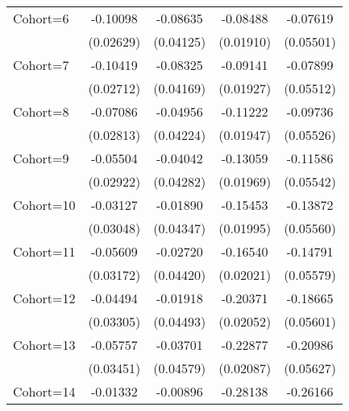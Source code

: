 \begin{table}[htbp]
\begin{tabular}{l*{4}{c}}
\addlinespace
Cohort=6            &    -0.10098\sym{***}&    -0.08635\sym{**} &    -0.08488\sym{***}&    -0.07619         \\
                    &   (0.02629)         &   (0.04125)         &   (0.01910)         &   (0.05501)         \\
\addlinespace
Cohort=7            &    -0.10419\sym{***}&    -0.08325\sym{**} &    -0.09141\sym{***}&    -0.07899         \\
                    &   (0.02712)         &   (0.04169)         &   (0.01927)         &   (0.05512)         \\
\addlinespace
Cohort=8            &    -0.07086\sym{**} &    -0.04956         &    -0.11222\sym{***}&    -0.09736\sym{*}  \\
                    &   (0.02813)         &   (0.04224)         &   (0.01947)         &   (0.05526)         \\
\addlinespace
Cohort=9            &    -0.05504\sym{*}  &    -0.04042         &    -0.13059\sym{***}&    -0.11586\sym{**} \\
                    &   (0.02922)         &   (0.04282)         &   (0.01969)         &   (0.05542)         \\
\addlinespace
Cohort=10           &    -0.03127         &    -0.01890         &    -0.15453\sym{***}&    -0.13872\sym{**} \\
                    &   (0.03048)         &   (0.04347)         &   (0.01995)         &   (0.05560)         \\
\addlinespace
Cohort=11           &    -0.05609\sym{*}  &    -0.02720         &    -0.16540\sym{***}&    -0.14791\sym{***}\\
                    &   (0.03172)         &   (0.04420)         &   (0.02021)         &   (0.05579)         \\
\addlinespace
Cohort=12           &    -0.04494         &    -0.01918         &    -0.20371\sym{***}&    -0.18665\sym{***}\\
                    &   (0.03305)         &   (0.04493)         &   (0.02052)         &   (0.05601)         \\
\addlinespace
Cohort=13           &    -0.05757\sym{*}  &    -0.03701         &    -0.22877\sym{***}&    -0.20986\sym{***}\\
                    &   (0.03451)         &   (0.04579)         &   (0.02087)         &   (0.05627)         \\
\addlinespace
Cohort=14           &    -0.01332         &    -0.00896         &    -0.28138\sym{***}&    -0.26166\sym{***}\\

\end{tabular}
\end{table}
